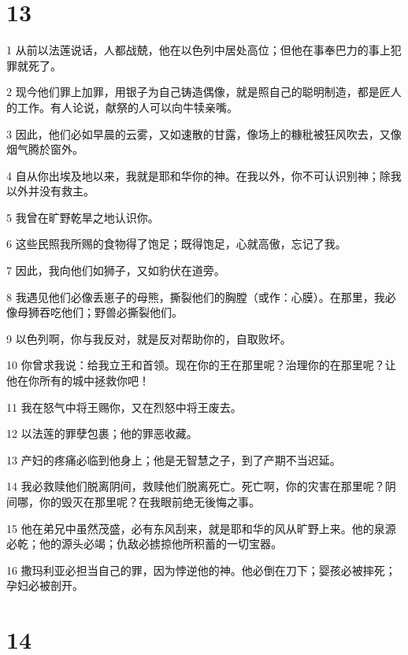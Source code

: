 \chapter{13}

\par 1 从前以法莲说话，人都战兢，他在以色列中居处高位；但他在事奉巴力的事上犯罪就死了。
\par 2 现今他们罪上加罪，用银子为自己铸造偶像，就是照自己的聪明制造，都是匠人的工作。有人论说，献祭的人可以向牛犊亲嘴。
\par 3 因此，他们必如早晨的云雾，又如速散的甘露，像场上的糠秕被狂风吹去，又像烟气腾於窗外。
\par 4 自从你出埃及地以来，我就是耶和华你的神。在我以外，你不可认识别神；除我以外并没有救主。
\par 5 我曾在旷野乾旱之地认识你。
\par 6 这些民照我所赐的食物得了饱足；既得饱足，心就高傲，忘记了我。
\par 7 因此，我向他们如狮子，又如豹伏在道旁。
\par 8 我遇见他们必像丢崽子的母熊，撕裂他们的胸膛（或作：心膜）。在那里，我必像母狮吞吃他们；野兽必撕裂他们。
\par 9 以色列啊，你与我反对，就是反对帮助你的，自取败坏。
\par 10 你曾求我说：给我立王和首领。现在你的王在那里呢？治理你的在那里呢？让他在你所有的城中拯救你吧！
\par 11 我在怒气中将王赐你，又在烈怒中将王废去。
\par 12 以法莲的罪孽包裹；他的罪恶收藏。
\par 13 产妇的疼痛必临到他身上；他是无智慧之子，到了产期不当迟延。
\par 14 我必救赎他们脱离阴间，救赎他们脱离死亡。死亡啊，你的灾害在那里呢？阴间哪，你的毁灭在那里呢？在我眼前绝无後悔之事。
\par 15 他在弟兄中虽然茂盛，必有东风刮来，就是耶和华的风从旷野上来。他的泉源必乾；他的源头必竭；仇敌必掳掠他所积蓄的一切宝器。
\par 16 撒玛利亚必担当自己的罪，因为悖逆他的神。他必倒在刀下；婴孩必被摔死；孕妇必被剖开。

\chapter{14}

